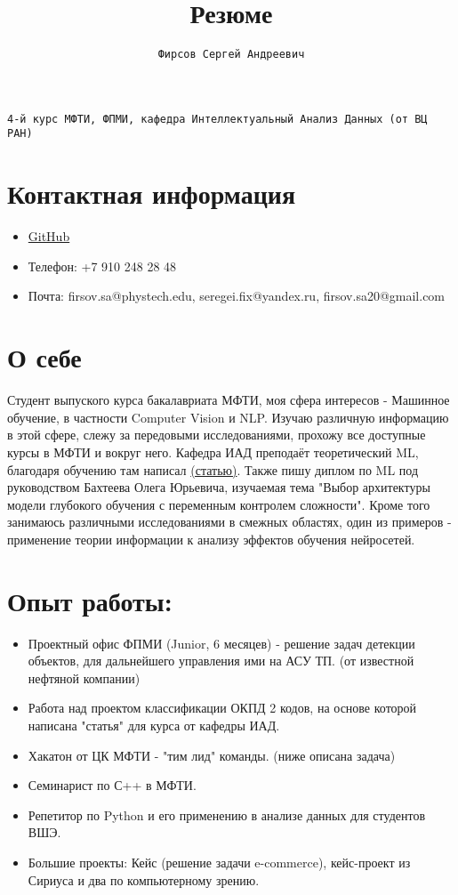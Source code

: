 \documentclass[a4paper,12pt]{article}
\title{\textbf{Резюме}}
\author{\texttt{Фирсов Сергей Андреевич}}
\date{}
\begin{document}
\maketitle

\texttt{4-й курс МФТИ, ФПМИ, кафедра Интеллектуальный Анализ Данных (от ВЦ РАН)}

\section*{Контактная информация}
\begin{itemize}
    \item \href{https://github.com/Schaft-s}{GitHub}
    \item Телефон: +7 910 248 28 48
    \item Почта: firsov.sa@phystech.edu, seregei.fix@yandex.ru, firsov.sa20@gmail.com
\end{itemize}

\section*{О себе}
Студент выпуского курса бакалавриата МФТИ, моя сфера интересов - Машинное обучение, в частности Computer Vision и NLP. Изучаю различную информацию в этой сфере, слежу за передовыми исследованиями, прохожу все доступные курсы в МФТИ и вокруг него. Кафедра ИАД преподаёт теоретический ML, благодаря обучению там написал  \href{https://github.com/intsystems/2024-Project-142}{(статью)}. Также пишу диплом по ML под руководством Бахтеева Олега Юрьевича, изучаемая тема "Выбор архитектуры модели глубокого обучения с переменным контролем сложности". Кроме того занимаюсь различными исследованиями в смежных областях, один из примеров - применение теории информации к анализу эффектов обучения нейросетей.

\section*{Опыт работы:}
\begin{itemize}
\item  Проектный офис ФПМИ (Junior, 6 месяцев) - решение задач детекции объектов, для дальнейшего управления ими на АСУ ТП. (от известной нефтяной компании)
\item  Работа над проектом классификации ОКПД 2 кодов, на основе которой написана "статья" для курса от кафедры ИАД. 
\item  Хакатон от ЦК МФТИ - "тим лид" команды. (ниже описана задача)
\item  Семинарист по С++ в МФТИ.
\item  Репетитор по Python и его применению в анализе данных для студентов ВШЭ.
\item  Большие проекты: Кейс (решение задачи e-commerce), кейс-проект из Сириуса и два по компьютерному зрению.
\end{itemize}
\end{document}
